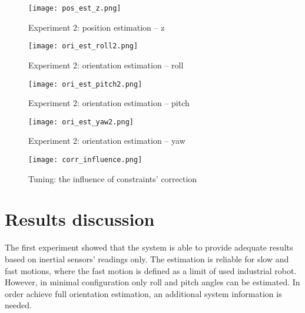 \begin{figure}[p]
	\centering
	\texttt{[image: pos\_est\_z.png]}
	\caption{Experiment 2: position estimation -- z}
	\label{pos_est_z}
\end{figure}

\begin{figure}[p]
	\centering
	\texttt{[image: ori\_est\_roll2.png]}
	\caption{Experiment 2: orientation estimation -- roll}
	\label{ori_est_roll2}
\end{figure}

\begin{figure}[p]
	\centering
	\texttt{[image: ori\_est\_pitch2.png]}
	\caption{Experiment 2: orientation estimation -- pitch}
	\label{ori_est_pitch2}
\end{figure}


\begin{figure}[p]
	\centering
	\texttt{[image: ori\_est\_yaw2.png]}
	\caption{Experiment 2: orientation estimation -- yaw}
	\label{ori_est_yaw2}
\end{figure}


\begin{figure}[p]
	\centering
	\texttt{[image: corr\_influence.png]}
	\caption{Tuning: the influence of constraints' correction}
	\label{corr_strength}
\end{figure}

\section{Results discussion}

The first experiment showed that the system is able to provide adequate results based on inertial sensors' readings only. The estimation is reliable for slow and fast motions, where the fast motion is defined as a limit of used industrial robot. However, in minimal configuration only roll and pitch angles can be estimated. In order achieve full orientation estimation, an additional system information is needed.\\

